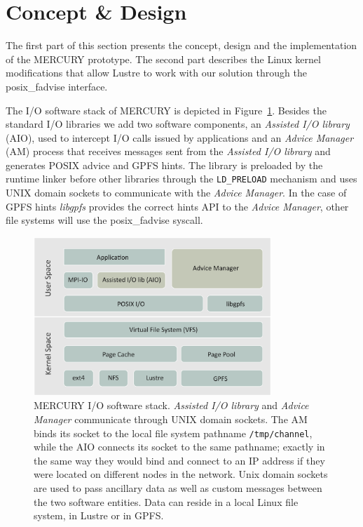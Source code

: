 \section{Concept \& Design}
\label{sec: mercury_concept}
The first part of this section presents the concept, design and the implementation of the MERCURY prototype. The second part describes the Linux kernel modifications that allow Lustre to work with our solution through the posix\_fadvise interface.

The I/O software stack of MERCURY is depicted in Figure~\ref{figure: softwarestack}. Besides the standard I/O libraries we add two software components, an \textit{Assisted I/O library} (AIO), used to intercept I/O calls issued by applications and an \textit{Advice Manager} (AM) process that receives messages sent from the \textit{Assisted I/O library} and generates POSIX advice and GPFS hints. The library is preloaded by the runtime linker before other libraries through the \texttt{LD\_PRELOAD} mechanism and uses UNIX domain sockets to communicate with the \textit{Advice Manager}. In the case of GPFS hints \textit{libgpfs} provides the correct hints API to the \textit{Advice Manager}, other file systems will use the posix\_fadvise syscall.

\begin{figure}[!htb]
  \centering
  \includegraphics[width=0.8\textwidth]{chapters/chapter2/figures/linux-software-stack}
  \caption{MERCURY I/O software stack. \textit{Assisted I/O library} and \textit{Advice Manager} communicate through UNIX domain sockets. The AM binds its socket to the local file system pathname \texttt{/tmp/channel}, while the AIO connects its socket to the same pathname; exactly in the same way they would bind and connect to an IP address if they were located on different nodes in the network. Unix domain sockets are used to pass ancillary data as well as custom messages between the two software entities. Data can reside in a local Linux file system, in Lustre or in GPFS.}
  \label{figure: softwarestack}
\end{figure}

